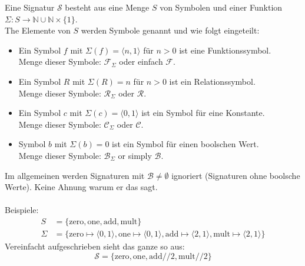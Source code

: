 \documentclass[twocolumn]{article}
\begin{document}
    Eine Signatur $\mathcal S$ besteht aus eine Menge $S$ von Symbolen und einer Funktion $\Sigma \colon S \to \mathbb N \cup \mathbb N \times \{1\}$.\\
    The Elemente von $S$ werden Symbole genannt und wie folgt eingeteilt:
    \begin{itemize}
        \item Ein Symbol $f$ mit $\Sigma(f) = \langle n, 1\rangle$ für $n > 0$ ist eine Funktionssymbol.\\
        Menge dieser Symbole: $\mathcal F_\Sigma$ oder einfach $\mathcal F$.
        \item Ein Symbol $R$ mit $\Sigma(R) = n$ für $n > 0$ ist ein Relationssymbol.\\
        Menge dieser Symbole: $\mathcal R_\Sigma$ oder $\mathcal R$.
        \item Ein Symbol $c$ mit $\Sigma(c) = \langle 0,1\rangle$ ist ein Symbol für eine Konstante.\\
        Menge dieser Symbole: $\mathcal C_\Sigma$ oder $\mathcal C$.
        \item Symbol $b$ mit $\Sigma(b) = 0$ ist ein Symbol für einen boolschen Wert. \\
        Menge dieser Symbole: $\mathcal B_\Sigma$ or simply $\mathcal B$.
    \end{itemize}
    Im allgemeinen werden Signaturen mit $\mathcal B \neq \emptyset$ ignoriert (Signaturen ohne boolsche Werte). Keine Ahnung warum er das sagt.\\\\
    Beispiele:
    \begin{align*}
        S &= \{\text{zero}, \text{one}, \text{add}, \text{mult}\}\\
        \Sigma &= \{\text{zero} \mapsto \langle 0,1\rangle, \text{one} \mapsto \langle 0,1\rangle, \text{add} \mapsto \langle 2,1\rangle, \text{mult} \mapsto \langle 2,1\rangle\}
    \end{align*}
   Vereinfacht aufgeschrieben sieht das ganze so aus:
    $$\mathcal S = \{\text{zero}, \text{one}, \text{add}/\!/2, \text{mult}/\!/2\}$$
\end{document}
